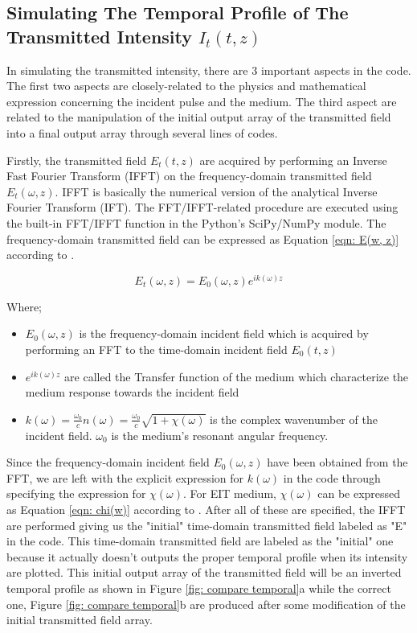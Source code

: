 \subsection{Simulating The Temporal Profile of The Transmitted Intensity $I_{t}(t, z)$}\label{temporalProfile}
In simulating the transmitted intensity, there are 3 important aspects in the code. The first two aspects are closely-related to the physics and mathematical expression concerning the incident pulse and the medium. The third aspect are related to the manipulation of the initial output array of the transmitted field into a final output array through several lines of codes.

Firstly, the transmitted field $E_{t}(t, z)$ are acquired by performing an Inverse Fast Fourier Transform (IFFT) on the frequency-domain transmitted field $E_{t}(\omega, z)$. IFFT is basically the numerical version of the analytical Inverse Fourier Transform (IFT). The FFT/IFFT-related procedure are executed using the built-in FFT/IFFT function in the Python's SciPy/NumPy module. The frequency-domain transmitted field can be expressed as Equation \ref{eqn: E(w, z)} according to .

\begin{equation}
    E_{t}(\omega, z) = E_{0}(\omega, z) e^{i k(\omega) z}
    \label{eqn: E(w, z)}
\end{equation}

Where;

\begin{itemize}
    \item $E_{0}(\omega, z)$ is the frequency-domain incident field which is acquired by performing an FFT to the time-domain incident field $E_{0}(t, z)$
    \item $e^{i k(\omega) z}$ are called the Transfer function of the medium which characterize the medium response towards the incident field
    \item $k(\omega) = \frac{\omega_{0}}{c} n(\omega) = \frac{\omega_{0}}{c} \sqrt{1 + \chi(\omega)}$ is the complex wavenumber of the incident field. $\omega_{0}$ is the medium's resonant angular frequency.
\end{itemize}

Since the frequency-domain incident field $E_{0}(\omega, z)$ have been obtained from the FFT, we are left with the explicit expression for $k(\omega)$ in the code through specifying the expression for $\chi(\omega)$. For EIT medium, $\chi(\omega)$ can be expressed as Equation \ref{eqn: chi(w)} according to . After all of these are specified, the IFFT are performed giving us the "initial" time-domain transmitted field labeled as "E" in the code. This time-domain transmitted field are labeled as the "initial" one because it actually doesn't outputs the proper temporal profile when its intensity are plotted. This initial output array of the transmitted field will be an inverted temporal profile as shown in Figure \ref{fig: compare temporal}a while the correct one, Figure \ref{fig: compare temporal}b are produced after some modification of the initial transmitted field array.

